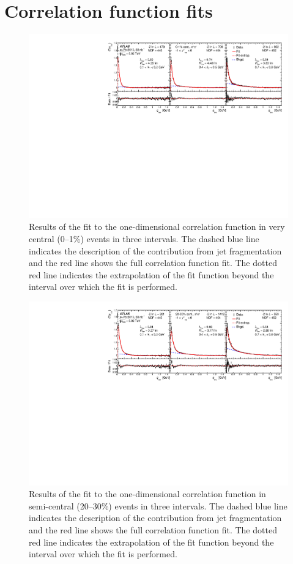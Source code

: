 \section{Correlation function fits}
\begin{figure}[t]
\centering
\includegraphics[width=\linewidth]{Cqinv_kt_cent0_e3_kys1.pdf}
\caption{Results of the fit to the one-dimensional correlation function in very central (0--1\%) events in three \kt intervals.
The dashed blue line indicates the description of the contribution from jet fragmentation and the red line shows the full correlation function fit.
The dotted red line indicates the extrapolation of the fit function beyond the interval over which the fit is performed.
}
\label{fig:cqinv_cent0}
\end{figure}
\begin{figure}[t]
\centering
\includegraphics[width=\linewidth]{Cqinv_kt_cent4_e3_kys1.pdf}
\caption{Results of the fit to the one-dimensional correlation function in semi-central (20--30\%) events in three \kt intervals.
The dashed blue line indicates the description of the contribution from jet fragmentation and the red line shows the full correlation function fit.
The dotted red line indicates the extrapolation of the fit function beyond the interval over which the fit is performed.
}
\label{fig:cqinv_cent4}
\end{figure}
